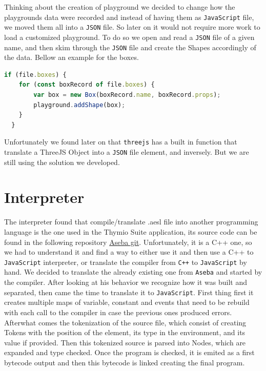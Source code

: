 \documentclass{scrbook}
\begin{document}
Thinking about the creation of playground we decided to change how the playgrounds data were recorded and instead of having them as \texttt{JavaScript} file, we moved them all into a \texttt{JSON} file. So later on it would not require more work to load a 
customized playground. To do so we open and read a \texttt{JSON} file of a given name, and then skim through the \texttt{JSON} file and create the Shapes accordingly of the data. Bellow an example for the boxes.

\begin{lstlisting}[language=JavaScript, gobble=2, basicstyle=\ttfamily\small]
  if (file.boxes) {
    for (const boxRecord of file.boxes) {
        var box = new Box(boxRecord.name, boxRecord.props);
        playground.addShape(box);
    }
  }
\end{lstlisting} 

Unfortunately we found later on that \texttt{threejs} has a built in function that translate a ThreeJS Object into a \texttt{JSON} file element, and inversely. But we are still using the solution we developed.

\section{Interpreter}

The interpreter found that compile/translate .aesl file into another programming language is the one used in the Thymio Suite application, its source code can be found in the following repository \href{https://github.com/aseba-community/aseba/tree/master/aseba/compiler}{Aseba git}.
Unfortunately, it is a C++ one, so we had to understand it and find a way to either use it and then use a C++ to \texttt{JavaScript} interpreter, or translate the compiler from \texttt{C++} to \texttt{JavaScript} by hand.
We decided to translate the already existing one from \texttt{Aseba} and started by the compiler. After looking at his behavior we recognize how it was built and separated,
then came the time to translate it to \texttt{JavaScript}. First thing first it creates multiple maps of variable, constant and events that need to be rebuild with each call to the compiler in case the previous ones produced errors.
Afterwhat comes the tokenization of the source file, which consist of creating Tokens with the position of the element, its type in the environment, and its value if provided. Then this tokenized source is parsed into Nodes, 
which are expanded and type checked. Once the program is checked, it is emited as a first bytecode output and then this bytecode is linked creating the final program.
\end{document}
